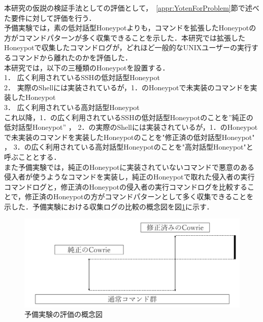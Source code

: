 本研究の仮説の検証手法としての評価として，~\ref{appr:YotenForProblem}節で述べた要件に対して評価を行う．\\
予備実験では，素の低対話型Honeypotよりも，コマンドを拡張したHoneypotの方がコマンドパターンが多く収集できることを示した．本研究では拡張したHoneypotで収集したコマンドログが，どれほど一般的なUNIXユーザーの実行するコマンド\cite{unixdata}から離れたのかを評価した．\\
本研究では，以下の三種類のHoneypotを設置する．\\
1． 広く利用されているSSHの低対話型Honeypot\\
2． 実際のShellには実装されているが，1．のHoneypotで未実装のコマンドを実装したHoneypot\\
3． 広く利用されている高対話型Honeypot\\

これ以降，1．の広く利用されているSSHの低対話型Honeypotのことを”純正の低対話型Honeypot” ， 2．の実際のShellには実装されているが，1．のHoneypotで未実装のコマンドを実装したHoneypotのことを"修正済の低対話型Honeypot" ， 3．の広く利用されている高対話型Honeypotのことを"高対話型Honeypot"と呼ぶこととする．\\


また予備実験では，純正のHoneypotに実装されていないコマンドで悪意のある侵入者が使うようなコマンドを実装し，純正のHoneypotで取れた侵入者の実行コマンドログと，修正済のHoneypotの侵入者の実行コマンドログを比較することで，修正済のHoneypotの方がコマンドパターンとして多く収集できることを示した．予備実験における収集ログの比較の概念図を図\ref{fig:yobigainen}に示す．

\begin{figure}[htbp]
    \centering
    \includegraphics[width=1.0\textwidth]{figures/termhyoka.png}
    \caption{予備実験の評価の概念図}
    \label{fig:yobigainen}
\end{figure}

